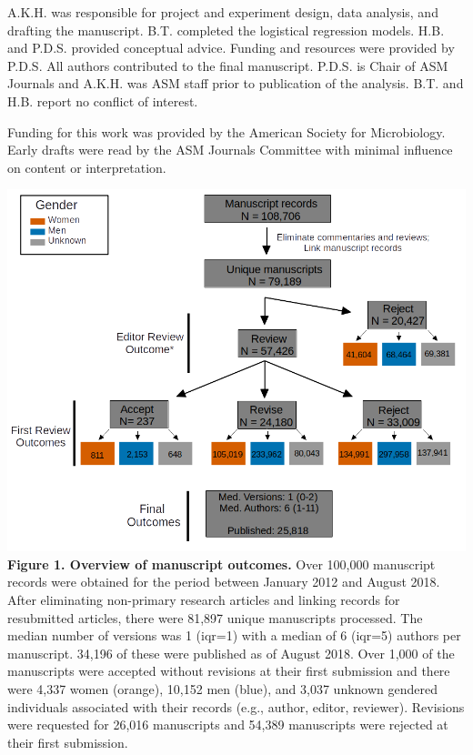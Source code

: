 \documentclass[11pt,]{article}
\begin{document}
A.K.H. was responsible for project and experiment design, data analysis,
and drafting the manuscript. B.T. completed the logistical regression
models. H.B. and P.D.S. provided conceptual advice. Funding and
resources were provided by P.D.S. All authors contributed to the final
manuscript. P.D.S. is Chair of ASM Journals and A.K.H. was ASM staff
prior to publication of the analysis. B.T. and H.B. report no conflict
of interest.

Funding for this work was provided by the American Society for
Microbiology. Early drafts were read by the ASM Journals Committee with
minimal influence on content or interpretation.

\newpage

\includegraphics{population_diagram.png} \textbf{Figure 1. Overview of
manuscript outcomes.} Over 100,000 manuscript records were obtained for
the period between January 2012 and August 2018. After eliminating
non-primary research articles and linking records for resubmitted
articles, there were 81,897 unique manuscripts processed. The median
number of versions was 1 (iqr=1) with a median of 6 (iqr=5) authors per
manuscript. 34,196 of these were published as of August 2018. Over 1,000
of the manuscripts were accepted without revisions at their first
submission and there were 4,337 women (orange), 10,152 men (blue), and
3,037 unknown gendered individuals associated with their records (e.g.,
author, editor, reviewer). Revisions were requested for 26,016
manuscripts and 54,389 manuscripts were rejected at their first
submission.
\end{document}
